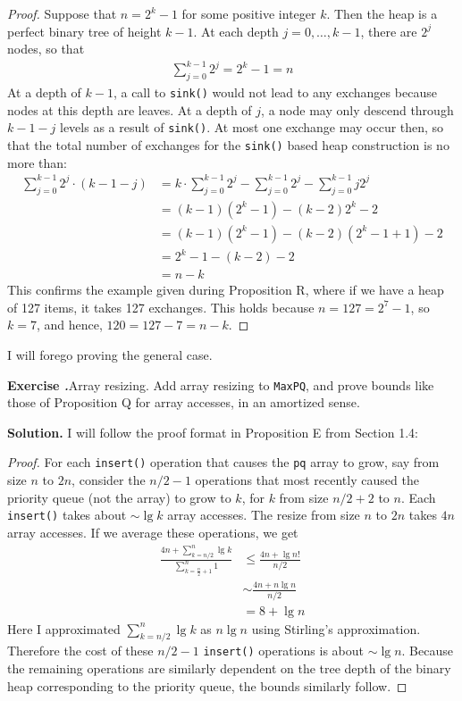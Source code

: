 \documentclass[12pt, a4paper]{article}
\newenvironment{ex}[2][Exercise]
{\par\medskip\noindent \textbf{#1 #2.}}
{\medskip}
\newenvironment{sol}[1][Solution]
{\par\medskip\noindent \textbf{#1.} }
{\medskip}
\begin{document}
	\begin{proof}
		Suppose that $n=2^k-1$ for some positive integer $k$. Then the heap is
		a perfect binary tree of height $k-1$. At each
		depth $j=0,\ldots,k-1$, there are $2^j$ nodes, so that
		\begin{align*}
			\sum_{j=0}^{k-1}2^j=2^k-1=n
		\end{align*}
		At a depth of $k-1$, a call to \texttt{sink()} would not lead to
		any exchanges because nodes at this depth are leaves. At a depth of $j$,
		a node may only descend through $k-1-j$ levels as a result of \texttt{sink()}.
		At most one exchange may occur then, so that the total number of exchanges
		for the \texttt{sink()} based heap construction is no more than:
		\begin{align*}
			\sum_{j=0}^{k-1}2^{j}\cdot (k-1-j)
			&=k\cdot \sum_{j=0}^{k-1}2^j-\sum_{j=0}^{k-1}2^j
			-\sum_{j=0}^{k-1}j2^j\\
			&=(k-1)(2^k-1)-(k-2)2^k - 2\\
			&=(k-1)(2^k-1)-(k-2)(2^k-1+1)-2\\
			&=2^k-1-(k-2)-2\\
			&=n-k
		\end{align*}
		This confirms the example given during Proposition R, where if we have
		a heap of 127 items, it takes 127 exchanges. This holds because
		$n=127=2^7-1$, so $k=7$, and hence, $120=127-7=n-k$.
	\end{proof}
	I will forego proving the general case.
	\begin{ex}{22}
		\emph{Array resizing}. Add array resizing to \texttt{MaxPQ}, and prove bounds
		like those of Proposition Q for array accesses, in an amortized sense.
	\end{ex}
	\begin{sol}
		I will follow the proof format in Proposition E from Section 1.4:
		\begin{proof}
			For each \texttt{insert()} operation that causes the \texttt{pq}
			array to grow, say from size $n$ to $2n$, consider the $n/2 - 1$
			operations that most recently caused the priority queue (not
			the array) to grow to $k$, for $k$ from size $n/2 +2$ to $n$.
			Each \texttt{insert()} takes about $\sim \lg k$ array accesses.
			The resize from size $n$ to $2n$ takes $4n$ array accesses.
			If we average these operations, we get
			\begin{align*}
				\frac{4n + \sum_{k=n/2}^{n}\lg k}{\sum_{k = \frac{n}{2} + 1}^{n}1}
				&\leq \frac{4n+\lg n!}{n/2}\\
				&\sim \frac{4n+n\lg n}{n / 2}\\
				&=8+\lg n
			\end{align*}
			Here I approximated $\sum_{k=n/2}^{n}\lg k$ as $n\lg n$ using Stirling's
			approximation. Therefore the cost of these $n / 2 - 1$ \texttt{insert()}
			operations is about $\sim \lg n$. Because the remaining operations
			are similarly dependent on the tree depth of the binary heap
			corresponding to the priority queue, the bounds similarly follow.
		\end{proof}
	\end{sol}
\end{document}
